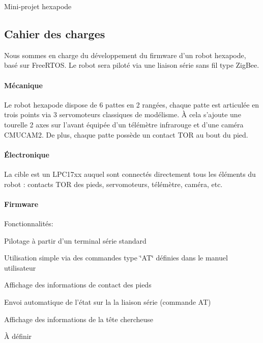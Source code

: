Mini-\/projet hexapode

\subsection*{Cahier des charges}

Nous sommes en charge du développement du firmware d'un robot hexapode, basé sur Free\-R\-T\-O\-S. Le robot sera piloté via une liaison série sans fil type Zig\-Bee.

\paragraph*{Mécanique}

Le robot hexapode dispose de 6 pattes en 2 rangées, chaque patte est articulée en trois points via 3 servomoteurs classiques de modélisme. À cela s'ajoute une tourelle 2 axes sur l'avant équipée d'un télémètre infrarouge et d'une caméra C\-M\-U\-C\-A\-M2. De plus, chaque patte possède un contact T\-O\-R au bout du pied.

\paragraph*{Électronique}

La cible est un L\-P\-C17xx auquel sont connectés directement tous les éléments du robot \-: contacts T\-O\-R des pieds, servomoteurs, télémètre, caméra, etc.

\paragraph*{Firmware}

Fonctionnalités\-:


\begin{DoxyItemize}
\item Pilotage à partir d'un terminal série standard
\begin{DoxyItemize}
\item Utilisation simple via des commandes type \char`\"{}\-A\-T\char`\"{} définies dans le manuel utilisateur
\end{DoxyItemize}
\item Affichage des informations de contact des pieds
\begin{DoxyItemize}
\item Envoi automatique de l'état sur la la liaison série (commande A\-T)
\end{DoxyItemize}
\item Affichage des informations de la tête chercheuse
\begin{DoxyItemize}
\item À définir
\end{DoxyItemize}
\end{DoxyItemize}

